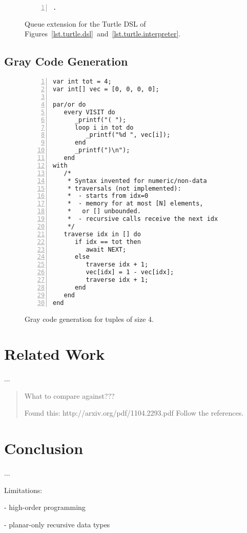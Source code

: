 \documentclass{acm_proc_article-sp}
\begin{document}
\begin{figure*}
\begin{minipage}[t]{0.38\linewidth}
\begin{lstlisting}[numbers=left,xleftmargin=3.5em,title=CODE-3: Command enqueuing]
.
\end{lstlisting}
\end{minipage}
%
\caption{ Queue extension for the Turtle DSL of
          Figures~\ref{lst.turtle.dsl}~and~\ref{lst.turtle.interpreter}.
\label{lst.turtle.queue}
}
\end{figure*}

\subsection{Gray Code Generation}

\begin{figure}%
\begin{lstlisting}[numbers=left,xleftmargin=3em]
var int tot = 4;
var int[] vec = [0, 0, 0, 0];

par/or do
   every VISIT do
      _printf("( ");
      loop i in tot do
         _printf("%d ", vec[i]);
      end
      _printf(")\n");
   end
with
   /*
    * Syntax invented for numeric/non-data
    * traversals (not implemented):
    *  - starts from idx=0
    *  - memory for at most [N] elements,
    *   or [] unbounded.
    *  - recursive calls receive the next idx
    */
   traverse idx in [] do
      if idx == tot then
         await NEXT;
      else
         traverse idx + 1;
         vec[idx] = 1 - vec[idx];
         traverse idx + 1;
      end
   end
end
\end{lstlisting}
\caption{ Gray code generation for tuples of size 4.
\label{lst.gray}
}
\end{figure}



\section{Related Work}

...

\begin{quotation}
What to compare against???

Found this: http://arxiv.org/pdf/1104.2293.pdf
Follow the references.
\end{quotation}

\section{Conclusion}

...

Limitations:

- high-order programming

- planar-only recursive data types



\balancecolumns
\end{document}
